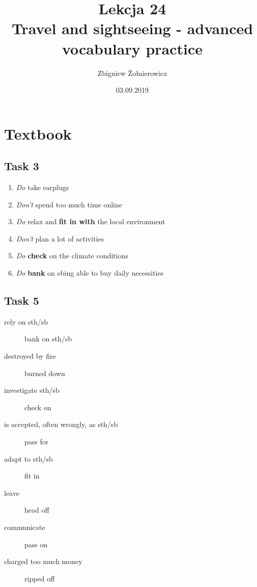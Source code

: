 \documentclass[a4paper]{article}
\begin{document}
    \title{{\huge Lekcja 24} \\
    {\large Travel and sightseeing - advanced vocabulary practice}}
    \author{Zbigniew Żołnierowicz}
    \date{03.09.2019}
    \maketitle
    \section*{Textbook}
        \subsection*{Task 3}
            \begin{enumerate}
                \item \emph{Do} take earplugs
                \item \emph{Don't} spend too much time online
                \item \emph{Do} relax and \textbf{fit in with} the local environment
                \item \emph{Don't} plan a lot of activities
                \item \emph{Do} \textbf{check} on the climate conditions
                \item \emph{Do} \textbf{bank} on ebing able to buy daily necessities
            \end{enumerate}
        \subsection*{Task 5}
            \begin{description}
                \item[rely on sth/sb] bank on sth/sb 
                \item[destroyed by fire] burned down
                \item[investigate sth/sb] check on
                \item[is accepted, often wrongly, as sth/sb] pass for
                \item[adapt to sth/sb] fit in
                \item[leave] head off
                \item[communicate] pass on
                \item[charged too much money] ripped off
            \end{description}
\end{document}
